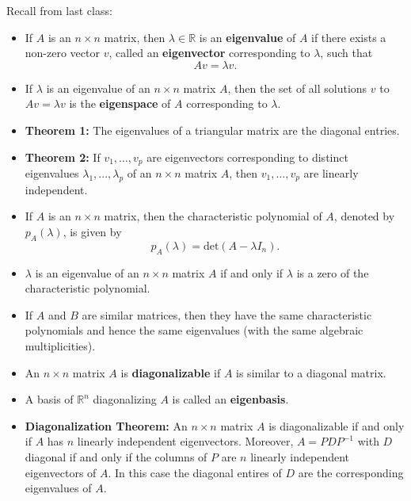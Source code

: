 \documentclass[12pt,letterpaper]{article}
\begin{document}
\thispagestyle{fancy}

Recall from last class:

\begin{itemize}
\item If $A$ is an $n \times n$ matrix, then $\lambda \in \mathbb{R}$ is an {\bf eigenvalue} of $A$ if there exists a non-zero vector $v$, called an {\bf eigenvector} corresponding to $\lambda$, such that $$Av=\lambda v.$$
\item If $\lambda$ is an eigenvalue of an $n \times n$ matrix $A$, then the set of all solutions $v$ to $Av = \lambda v$ is the {\bf eigenspace} of $A$ corresponding to $\lambda$.
\item {\bf Theorem 1:} The eigenvalues of a triangular matrix are the diagonal entries.
\item {\bf Theorem 2:} If $v_1, \dots, v_p$ are eigenvectors corresponding to distinct eigenvalues $\lambda_1, \dots, \lambda_p$ of an $n\times n$ matrix $A$, then $v_1, \dots, v_p$ are linearly independent.
\item If $A$ is an $n\times n$ matrix, then the characteristic polynomial of $A$, denoted by $p_A(\lambda)$, is given by $$p_A(\lambda)=\text{det}(A-\lambda I_n).$$
\item $\lambda$ is an eigenvalue of an $n\times n$ matrix $A$ if and only if $\lambda$ is a zero of the characteristic polynomial.
\item If $A$ and $B$ are similar matrices, then they have the same characteristic polynomials and hence the same eigenvalues (with the same algebraic multiplicities). 
\item An $n\times n$ matrix $A$ is {\bf diagonalizable} if $A$ is similar to a diagonal matrix.
\item A basis of $\mathbb{R}^n$ diagonalizing $A$ is called an {\bf eigenbasis}. 
\item {\bf Diagonalization Theorem:} An $n \times n$ matrix $A$ is diagonalizable if and only if $A$ has $n$ linearly independent eigenvectors. Moreover, $A=PDP^{-1}$ with $D$ diagonal if and only if the columns of $P$ are $n$ linearly independent eigenvectors of $A$. In this case the diagonal entires of $D$ are the corresponding eigenvalues of $A$.
\end{itemize}



\newpage
\end{document}
